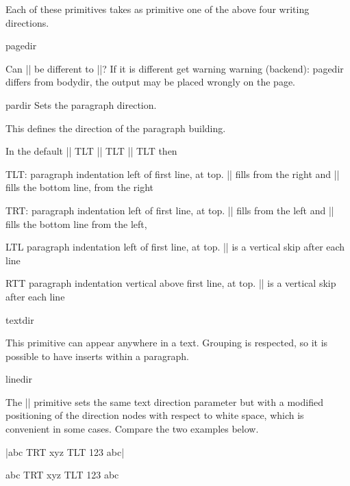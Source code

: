 Each of these primitives takes as primitive one of the above four writing directions.



\begin{docCommand}{pagedir}{}
\end{docCommand}


Can |\bodydir| be different to |\pagedir|? If it is different get warning
warning  (backend):
  pagedir differs from bodydir, the output may be placed wrongly on the page.


\begin{docCommand}{pardir}{}
Sets the paragraph direction.
\end{docCommand}


This defines the direction of the paragraph building.\par
In the default |\pagedir| TLT |\bodydir| TLT |\textdir| TLT then

TLT:
paragraph indentation left of first line, at top.
|\rightskip| fills from the right and |\parfillskip| fills the bottom line, from the right

TRT:
paragraph indentation left of first line, at top.
|\rightskip| fills from the left and |\parfillskip| fills the bottom line from the left,

LTL
paragraph indentation left of first line, at top.
|\rightskip| is a vertical skip after each line

RTT
paragraph indentation vertical above first line, at top.
|\rightskip| is a vertical skip after each line


\begin{docCommand}{textdir}{}
\end{docCommand}

This primitive can appear anywhere in a text.
Grouping is respected, so it is possible to have inserts within a
paragraph.

\begin{docCommand}{linedir}{}
\end{docCommand}

The |\linedir| primitive sets the same text direction parameter but
with a modified positioning of the direction nodes with respect to white
space, which is convenient in some cases. Compare the two examples below.


|abc {\textdir TRT xyz \textdir TLT 123} abc|

abc {\textdir TRT xyz \textdir TLT 123} abc

